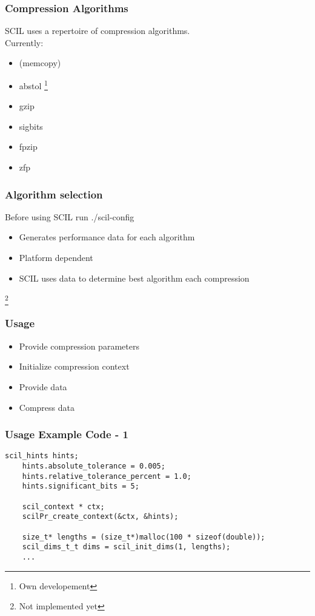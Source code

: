 \documentclass[compress]{beamer}
\begin{document}
\begin{frame}
	\frametitle{Compression Algorithms}

	SCIL uses a repertoire of compression algorithms.\\
	Currently:

	\bigskip

	\begin{itemize}
		\item (memcopy)
		\item abstol \footnote{Own developement}
		\item gzip
		\item sigbits \footnotemark[\value{footnote}]
		\item fpzip
		\item zfp
	\end{itemize}

	\setcounter{footnote}{0}
\end{frame}

\begin{frame}
	\frametitle{Algorithm selection}

	Before using SCIL run ./scil-config

	\bigskip

	\begin{itemize}
		\item Generates performance data for each algorithm
		\item Platform dependent
		\item SCIL uses data to determine best algorithm each compression
	\end{itemize}

	\footnote{Not implemented yet}
\end{frame}

\begin{frame}
	\frametitle{Usage}

	\begin{itemize}
		\item Provide compression parameters
		\item Initialize compression context
		\item Provide data
		\item Compress data
	\end{itemize}
\end{frame}

\begin{frame}[fragile]
	\frametitle{Usage Example Code - 1}

	\begin{lstlisting}[caption=SCIL usage example - 1]
	scil_hints hints;
	hints.absolute_tolerance = 0.005;
	hints.relative_tolerance_percent = 1.0;
	hints.significant_bits = 5;

	scil_context * ctx;
	scilPr_create_context(&ctx, &hints);

	size_t* lengths = (size_t*)malloc(100 * sizeof(double));
	scil_dims_t_t dims = scil_init_dims(1, lengths);
	...
	\end{lstlisting}

\end{frame}
\end{document}
